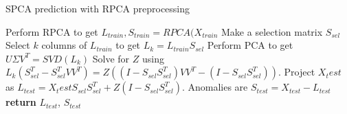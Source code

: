 \documentclass[conference]{IEEEtran}
\begin{document}
\begin{algorithm}
\caption{SPCA prediction with RPCA preprocessing}\label{alg:spca and rpca prediction}
\begin{algorithmic}[1]
\State Perform RPCA to get $L_{train}, S_{train} = RPCA(X_{train}$
\State Make a selection matrix $S_{sel}$
\State Select $k$ columns of $L_{train}$ to get $L_k = L_{train} S_{sel}$
\State Perform PCA to get $U \Sigma V^T = SVD(L_k)$
\State Solve for $Z$ using $L_k (S_{sel}^T - S_{sel}^T V V^T) = Z ((I-S_{sel} S_{sel}^T)V V^T - (I-S_{sel} S_{sel}^T))$.
\State Project $X_test$ as $L_{test} = X_test S_{sel} S_{sel}^T + Z (I-S_{sel} S_{sel}^T)$.
\State Anomalies are $S_{test} = X_{test} - L_{test}$
\State \textbf{return} $L_{test}$, $S_{test}$
\EndProcedure
\end{algorithmic}
\end{algorithm}

\end{document}
